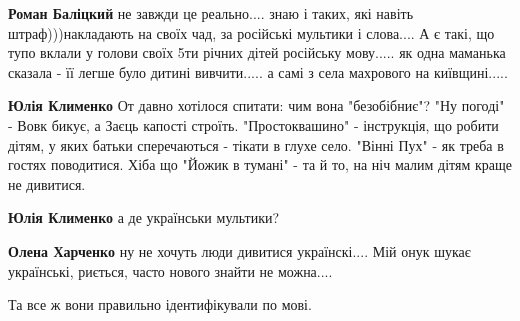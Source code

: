 \begin{itemize}
\begin{itemize}
\textbf{Роман Баліцкий} не завжди це реально.... знаю і таких, які навіть
штраф)))накладають на своїх чад, за російські мультики і слова.... А є такі, що
тупо вклали у голови своїх 5ти річних дітей російську мову..... як одна маманька
сказала - її легше було дитині вивчити..... а самі з села махрового на
київщині.....

 
\textbf{Юлія Клименко} От давно хотілося спитати: чим вона "безобібниє"? "Ну
погоді" - Вовк бикує, а Заєць капості строїть. "Простоквашино" - інструкція, що
робити дітям, у яких батьки сперечаються - тікати в глухе село. "Вінні Пух" -
як треба в гостях поводитися. Хіба що "Йожик в тумані" - та й то, на ніч малим
дітям краще не дивитися.

 
\textbf{Юлія Клименко} а де українськи мультики?

 
\textbf{Олена Харченко} ну не хочуть люди дивитися українскі.... Мій онук шукає українські, риється, часто нового знайти не можна....
\end{itemize}

 
Та все ж вони правильно ідентифікували по мові.

 


\end{itemize}
